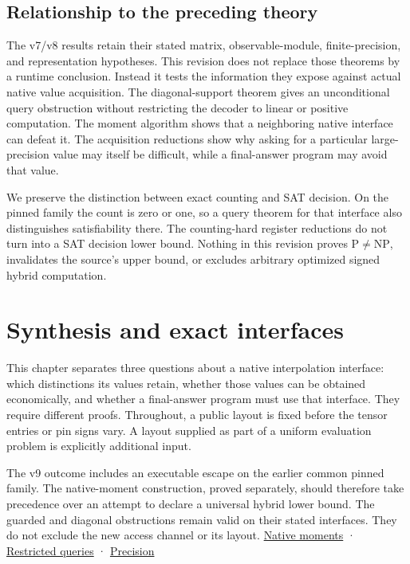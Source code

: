 \documentclass[
  11pt,
]{article}
\begin{document}
\subsection{Relationship to the preceding
theory}\label{v9-relationship-to-the-preceding-theory}

The v7/v8 results retain their stated matrix, observable-module,
finite-precision, and representation hypotheses. This revision does not
replace those theorems by a runtime conclusion. Instead it tests the
information they expose against actual native value acquisition. The
diagonal-support theorem gives an unconditional query obstruction
without restricting the decoder to linear or positive computation. The
moment algorithm shows that a neighboring native interface can defeat
it. The acquisition reductions show why asking for a particular
large-precision value may itself be difficult, while a final-answer
program may avoid that value.

We preserve the distinction between exact counting and SAT decision. On
the pinned family the count is zero or one, so a query theorem for that
interface also distinguishes satisfiability there. The counting-hard
register reductions do not turn into a SAT decision lower bound. Nothing
in this revision proves \(\mathrm P\ne\mathrm{NP}\), invalidates the
source's upper bound, or excludes arbitrary optimized signed hybrid
computation.

\section{Synthesis and exact interfaces}\label{v9-section-synthesis}

This chapter separates three questions about a native interpolation
interface: which distinctions its values retain, whether those values
can be obtained economically, and whether a final-answer program must
use that interface. They require different proofs. Throughout, a public
layout is fixed before the tensor entries or pin signs vary. A layout
supplied as part of a uniform evaluation problem is explicitly
additional input.

The v9 outcome includes an executable escape on the earlier common
pinned family. The native-moment construction, proved separately, should
therefore take precedence over an attempt to declare a universal hybrid
lower bound. The guarded and diagonal obstructions remain valid on their
stated interfaces. They do not exclude the new access channel or its
layout. \hyperref[v9-section-moment-escape]{Native moments} ·
\hyperref[v9-section-joint-algorithms]{Restricted queries} ·
\hyperref[v9-section-precision-frontier]{Precision}
\end{document}
